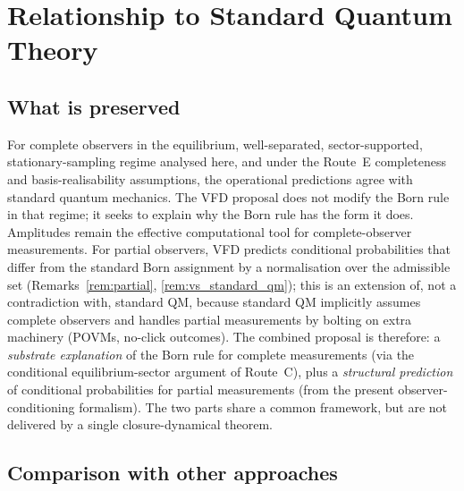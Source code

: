 \documentclass[12pt]{article}
\begin{document}
\section{Relationship to Standard Quantum Theory}\label{sec:comparison}

\subsection{What is preserved}

For complete observers in the equilibrium, well-separated, sector-supported, stationary-sampling regime analysed here, and under the Route~E completeness and basis-realisability assumptions, the operational predictions agree with standard quantum mechanics. The VFD proposal does not modify the Born rule in that regime; it seeks to explain why the Born rule has the form it does. Amplitudes remain the effective computational tool for complete-observer measurements. For partial observers, VFD predicts conditional probabilities that differ from the standard Born assignment by a normalisation over the admissible set (Remarks~\ref{rem:partial}, \ref{rem:vs_standard_qm}); this is an extension of, not a contradiction with, standard QM, because standard QM implicitly assumes complete observers and handles partial measurements by bolting on extra machinery (POVMs, no-click outcomes). The combined proposal is therefore: a \textit{substrate explanation} of the Born rule for complete measurements (via the conditional equilibrium-sector argument of Route~C), plus a \textit{structural prediction} of conditional probabilities for partial measurements (from the present observer-conditioning formalism). The two parts share a common framework, but are not delivered by a single closure-dynamical theorem.

\subsection{Comparison with other approaches}
\end{document}
